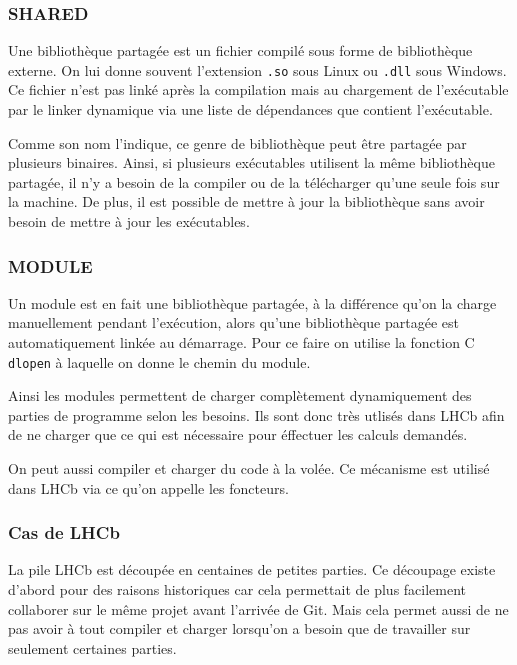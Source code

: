 \documentclass[a4paper]{report}
\begin{document}
            \subsubsection{SHARED}
                Une bibliothèque partagée est un fichier compilé sous forme de bibliothèque externe.
                On lui donne souvent l'extension \verb'.so' sous Linux ou \verb'.dll' sous Windows.
                Ce fichier n'est pas linké après la compilation mais au chargement de l'exécutable par le linker dynamique via une liste de dépendances que contient l'exécutable.

                Comme son nom l'indique, ce genre de bibliothèque peut être partagée par plusieurs binaires.
                Ainsi, si plusieurs exécutables utilisent la même bibliothèque partagée, il n'y a besoin de la compiler ou de la télécharger qu'une seule fois sur la machine.
                De plus, il est possible de mettre à jour la bibliothèque sans avoir besoin de mettre à jour les exécutables.

            \subsubsection{MODULE}
                Un module est en fait une bibliothèque partagée, à la différence qu'on la charge manuellement pendant l'exécution, alors qu'une bibliothèque partagée est automatiquement linkée au démarrage.
                Pour ce faire on utilise la fonction C \verb'dlopen' à laquelle on donne le chemin du module.

                Ainsi les modules permettent de charger complètement dynamiquement des parties de programme selon les besoins.
                Ils sont donc très utlisés dans LHCb afin de ne charger que ce qui est nécessaire pour éffectuer les calculs demandés.

                On peut aussi compiler et charger du code à la volée.
                Ce mécanisme est utilisé dans LHCb via ce qu'on appelle les foncteurs.

            \subsubsection{Cas de LHCb}
                La pile LHCb est découpée en centaines de petites parties.
                Ce découpage existe d'abord pour des raisons historiques car cela permettait de plus facilement collaborer sur le même projet avant l'arrivée de Git.
                Mais cela permet aussi de ne pas avoir à tout compiler et charger lorsqu'on a besoin que de travailler sur seulement certaines parties.
\end{document}
